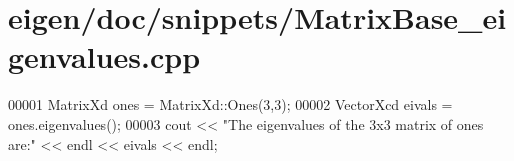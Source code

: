 \hypertarget{eigen_2doc_2snippets_2_matrix_base__eigenvalues_8cpp_source}{}\section{eigen/doc/snippets/\+Matrix\+Base\+\_\+eigenvalues.cpp}
\label{eigen_2doc_2snippets_2_matrix_base__eigenvalues_8cpp_source}

\begin{DoxyCode}
00001 MatrixXd ones = MatrixXd::Ones(3,3);
00002 VectorXcd eivals = ones.eigenvalues();
00003 cout << \textcolor{stringliteral}{"The eigenvalues of the 3x3 matrix of ones are:"} << endl << eivals << endl;
\end{DoxyCode}
